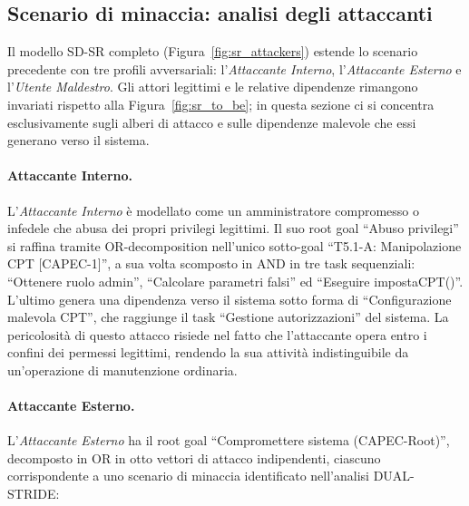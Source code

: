 \subsection{Scenario di minaccia: analisi degli attaccanti}
Il modello SD-SR completo (Figura~\ref{fig:sr_attackers}) estende lo scenario precedente con tre profili avversariali: l'\textit{Attaccante Interno}, l'\textit{Attaccante Esterno} e l'\textit{Utente Maldestro}. Gli attori legittimi e le relative dipendenze rimangono invariati rispetto alla Figura~\ref{fig:sr_to_be}; in questa sezione ci si concentra esclusivamente sugli alberi di attacco e sulle dipendenze malevole che essi generano verso il sistema.

\paragraph{Attaccante Interno.}
L'\textit{Attaccante Interno} è modellato come un amministratore compromesso o infedele che abusa dei propri privilegi legittimi. Il suo root goal ``Abuso privilegi'' si raffina tramite OR-decomposition nell'unico sotto-goal ``T5.1-A: Manipolazione CPT [CAPEC-1]'', a sua volta scomposto in AND in tre task sequenziali: ``Ottenere ruolo admin'', ``Calcolare parametri falsi'' ed ``Eseguire impostaCPT()''. L'ultimo genera una dipendenza verso il sistema sotto forma di ``Configurazione malevola CPT'', che raggiunge il task ``Gestione autorizzazioni'' del sistema. La pericolosità di questo attacco risiede nel fatto che l'attaccante opera entro i confini dei permessi legittimi, rendendo la sua attività indistinguibile da un'operazione di manutenzione ordinaria.

\paragraph{Attaccante Esterno.}
L'\textit{Attaccante Esterno} ha il root goal ``Compromettere sistema (CAPEC-Root)'', decomposto in OR in otto vettori di attacco indipendenti, ciascuno corrispondente a uno scenario di minaccia identificato nell'analisi DUAL-STRIDE:

